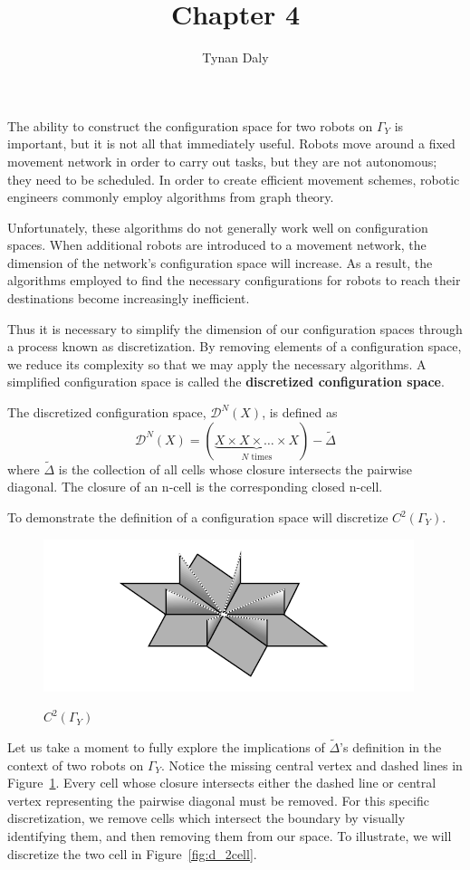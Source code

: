 \documentclass[12pt,oneside]{amsbook}
\title{Chapter 4}
\author{Tynan Daly}
\newenvironment{defn}[1][Definition]{\begin{trivlist}
\item[\hskip \labelsep {\bfseries #1}]}{\end{trivlist}}
\newcommand{\Y}{\Gamma_Y}
\newcommand{\C}{$C^2(\Y)$}
\begin{document}
The ability to construct the configuration space for two robots on $\Y$ is important, but it is not all that immediately useful. Robots move around a fixed movement network in order to carry out tasks, but they are not autonomous; they need to be scheduled. In order to create efficient movement schemes, robotic engineers commonly employ algorithms from graph theory.

Unfortunately, these algorithms do not generally work well on configuration spaces. When additional robots are introduced to a movement network, the dimension of the network's configuration space will increase. As a result, the algorithms employed to find the necessary configurations for robots to reach their destinations become increasingly inefficient. 

Thus it is necessary to simplify the dimension of our configuration spaces through a process known as discretization. By removing elements of a configuration space, we reduce its complexity so that we may apply the necessary algorithms. A simplified configuration space is called the \textbf{discretized configuration space}.


\begin{defn}
The discretized configuration space, $\mathcal{D}^N( X)$, is defined as $$\mathcal{D}^N(X) = (\underbrace{X\times X \times \dots \times X}_{N\text{ times}}) - \tilde{\Delta} $$ where $\tilde{\Delta}$ is the collection of all cells whose closure intersects the pairwise diagonal. The closure of an n-cell is the corresponding closed n-cell.
\end{defn}

To demonstrate the definition of a configuration space will discretize \C.


\begin{figure}[h]
\centering
\caption{$C^2(\Y)$}
\includegraphics[scale=1]{Presentation/Config.jpg}
\label{fig:config4}
\end{figure}

Let us take a moment to fully explore the implications of $\tilde{\Delta}$'s definition in the context of two robots on $\Y$. Notice the missing central vertex and dashed lines in Figure~\ref{fig:config4}. Every cell whose closure intersects either the dashed line or central vertex representing the pairwise diagonal must be removed. For this specific discretization, we remove cells which intersect the boundary by visually identifying them, and then removing them from our space. To illustrate, we will discretize the two cell in Figure~\ref{fig:d_2cell}.
\end{document}
